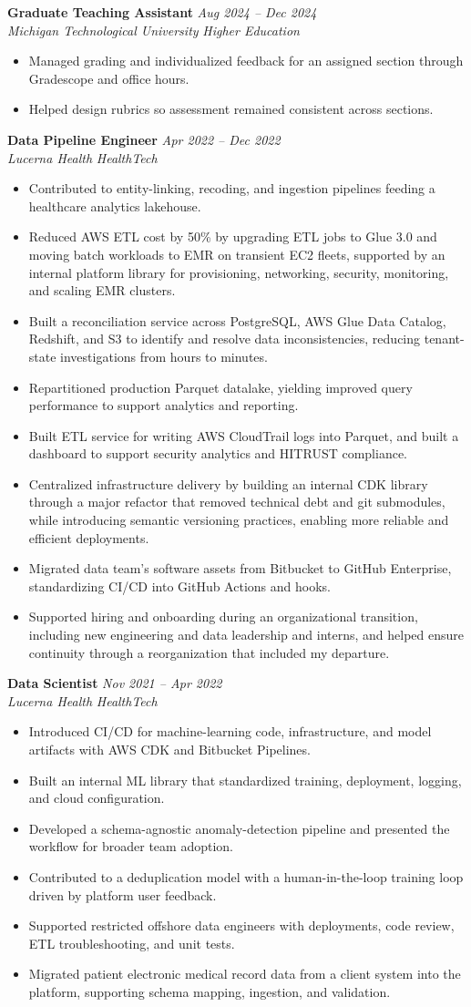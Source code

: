 \documentclass[10pt,letterpaper]{article}
\newcommand{\resumeItem}[1]{\item \small #1}
\newcommand{\resumeSubheading}[4]{%
  \textbf{#1} \hfill \small{\textit{#2}}\\
  \small{\textit{#3}} \hfill \small{\textit{#4}}\par
}
\begin{document}
\resumeSubheading{Graduate Teaching Assistant}{Aug 2024 -- Dec 2024}{Michigan Technological University}{Higher Education}
\begin{itemize}
  \resumeItem{Managed grading and individualized feedback for an assigned section through Gradescope and office hours.}
  \resumeItem{Helped design rubrics so assessment remained consistent across sections.}
\end{itemize}

\resumeSubheading{Data Pipeline Engineer}{Apr 2022 -- Dec 2022}{Lucerna Health}{HealthTech}
\begin{itemize}
  \resumeItem{Contributed to entity-linking, recoding, and ingestion pipelines feeding a healthcare analytics lakehouse.}
  \resumeItem{Reduced AWS ETL cost by 50\% by upgrading ETL jobs to Glue 3.0 and moving batch workloads to EMR on transient EC2 fleets, supported by an internal platform library for provisioning, networking, security, monitoring, and scaling EMR clusters.}
  \resumeItem{Built a reconciliation service across PostgreSQL, AWS Glue Data Catalog, Redshift, and S3 to identify and resolve data inconsistencies,
  reducing tenant-state investigations from hours to minutes.}
  \resumeItem{Repartitioned production Parquet datalake, yielding improved query performance to support analytics and reporting.}
  \resumeItem{Built ETL service for writing AWS CloudTrail logs into Parquet, and built a dashboard to support security analytics and HITRUST compliance.}
  \resumeItem{Centralized infrastructure delivery by building an internal CDK library through a major refactor that removed technical debt and git submodules, while introducing semantic versioning practices, enabling more reliable and efficient deployments.}
  \resumeItem{Migrated data team's software assets from Bitbucket to GitHub Enterprise, standardizing CI/CD into GitHub Actions and hooks.}
  \resumeItem{Supported hiring and onboarding during an organizational transition, including new engineering and data leadership and interns, and helped ensure continuity through a reorganization that included my departure.}
\end{itemize}

\resumeSubheading{Data Scientist}{Nov 2021 -- Apr 2022}{Lucerna Health}{HealthTech}
\begin{itemize}
  \resumeItem{Introduced CI/CD for machine-learning code, infrastructure, and model artifacts with AWS CDK and Bitbucket Pipelines.}
  \resumeItem{Built an internal ML library that standardized training, deployment, logging, and cloud configuration.}
  \resumeItem{Developed a schema-agnostic anomaly-detection pipeline and presented the workflow for broader team adoption.}
  \resumeItem{Contributed to a deduplication model with a human-in-the-loop training loop driven by platform user feedback.}
  \resumeItem{Supported restricted offshore data engineers with deployments, code review, ETL troubleshooting, and unit tests.}
  \resumeItem{Migrated patient electronic medical record data from a client system into the platform, supporting schema mapping, ingestion, and validation.}
\end{itemize}
\end{document}
